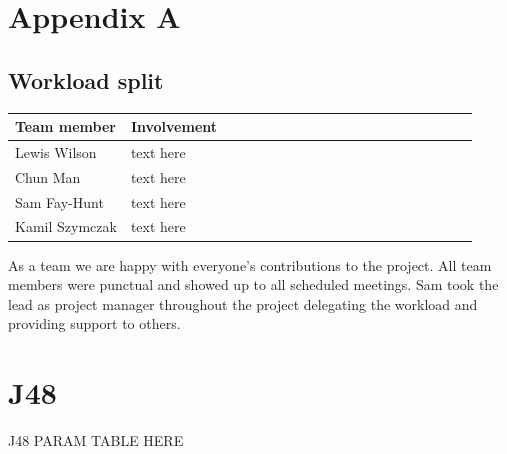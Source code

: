 \documentclass[11pt]{article}
\begin{document}
\pagebreak
\appendix
\appendixpage
\addappheadtotoc
\begin{appendices}

\section{Appendix A}


\subsection{Workload split}
  
  \begin{table}[ht]
    \centering
    \begin{tabular}{|p{0.25\linewidth} | p{0.8\linewidth}|} 
      \hline
      \textbf{Team member}  & \textbf{Involvement} \\ \hline
      Lewis Wilson & text here \\ \hline
      Chun Man & text here  \\ \hline
      Sam Fay-Hunt & text here \\ \hline
      Kamil Szymczak & text here \\ \hline
    \end{tabular}
  \end{table}\label{ContributionTab}

As a team we are happy with everyone's contributions to the project. All team members were punctual and showed up to all scheduled meetings. Sam took the lead as project manager throughout the project delegating the workload and providing support to others.


\newpage
\section{J48}

\huge{J48 PARAM TABLE HERE}


\end{appendices}
\end{document}
